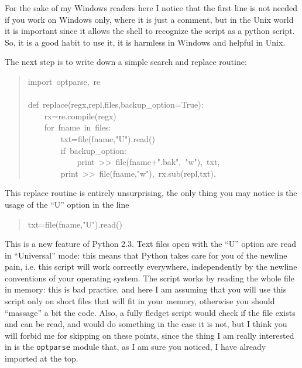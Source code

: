 \documentclass[10pt,english]{article}
\begin{document}
For the sake of my Windows readers here I notice
that the first line is not needed if you work on
Windows only, where it is just a comment, but in
the Unix world it is important since it allows the
shell to recognize the script as a python script.
So, it is a good habit to use it, it is harmless in Windows
and helpful in Unix.

The next step is to write down a simple search and replace routine:
\begin{quote}
\begin{ttfamily}\begin{flushleft}
\mbox{import~optparse,~re}\\
\mbox{}\\
\mbox{def~replace(regx,repl,files,backup{\_}option=True):}\\
\mbox{~~~~rx=re.compile(regx)}\\
\mbox{~~~~for~fname~in~files:}\\
\mbox{~~~~~~~~txt=file(fname,"U").read()}\\
\mbox{~~~~~~~~if~backup{\_}option:}\\
\mbox{~~~~~~~~~~~~print~>>~file(fname+".bak",~"w"),~txt,}\\
\mbox{~~~~~~~~print~>>~file(fname,"w"),~rx.sub(repl,txt),}
\end{flushleft}\end{ttfamily}
\end{quote}

This replace routine is entirely unsurprising, the only thing you
may notice is the usage of the ``U'' option in the line
\begin{quote}
\begin{ttfamily}\begin{flushleft}
\mbox{txt=file(fname,"U").read()}
\end{flushleft}\end{ttfamily}
\end{quote}

This is a new feature of Python 2.3. Text files open with the ``U''
option are read in ``Universal'' mode: this means that Python takes
care for you of the newline pain, i.e. this script will work 
correctly everywhere, independently by the newline
conventions of your operating system. The script works by reading 
the whole file in memory: this is bad practice, and here I am assuming 
that you will use this script only on short files that will fit in 
your memory, otherwise you should ``massage'' a bit the code.
Also, a fully fledget script would check if the file exists 
and can be read, and would do something in the case it is not,
but I think you will forbid me for skipping on these points,
since the thing I am really interested in is the \texttt{optparse}
module that, as I am sure you noticed, I have already imported 
at the top.
\end{document}
